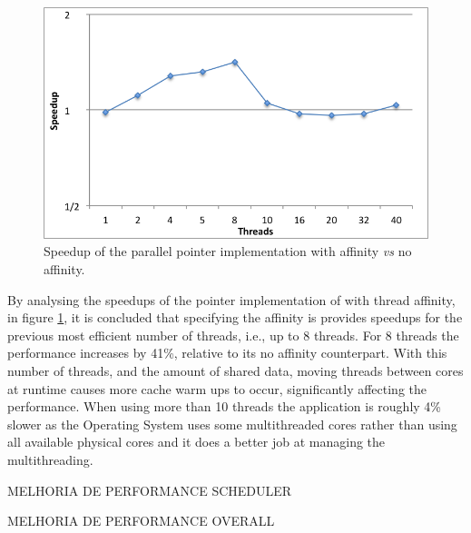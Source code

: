 \begin{figure}[!htp]
	\begin{center}
		\includegraphics[scale=0.4]{charts/speedup_pointer_aff.png}
		\caption{Speedup of the \tth parallel pointer implementation with affinity \textit{vs} no affinity.}
		\label{fig:pointer_aff}
	\end{center}
\end{figure}

By analysing the speedups of the pointer implementation of \tth with thread affinity, in figure \ref{fig:pointer_aff}, it is concluded that specifying the affinity is provides speedups for the previous most efficient number of threads, i.e., up to 8 threads. For 8 threads the performance increases by 41\%, relative to its no affinity counterpart. With this number of threads, and the amount of shared data, moving threads between cores at runtime causes more cache warm ups to occur, significantly affecting the performance. When using more than 10 threads the application is roughly 4\% slower as the Operating System uses some multithreaded cores rather than using all available physical cores and it does a better job at managing the multithreading.

MELHORIA DE PERFORMANCE SCHEDULER

MELHORIA DE PERFORMANCE OVERALL
